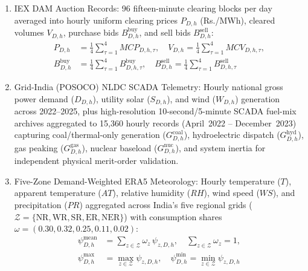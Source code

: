 \documentclass[runningheads,a4paper]{llncs}
\begin{document}
\begin{enumerate}
    \item IEX DAM Auction Records: 96 fifteen-minute clearing blocks per day averaged into hourly uniform clearing prices $P_{D,h}$ (Rs./MWh), cleared volumes $V_{D,h}$, purchase bids $B_{D,h}^{\text{buy}}$, and sell bids $B_{D,h}^{\text{sell}}$:
    \begin{equation}
    \begin{aligned}
    P_{D,h} &= \frac{1}{4}\sum_{\tau=1}^{4} MCP_{D,h,\tau}, \quad V_{D,h} = \frac{1}{4}\sum_{\tau=1}^{4} MCV_{D,h,\tau}, \\
    B_{D,h}^{\text{buy}} &= \frac{1}{4}\sum_{\tau=1}^{4} B_{D,h,\tau}^{\text{buy}}, \quad B_{D,h}^{\text{sell}} = \frac{1}{4}\sum_{\tau=1}^{4} B_{D,h,\tau}^{\text{sell}}
    \end{aligned}
    \label{eq:block_agg}
    \end{equation}
    \item Grid-India (POSOCO) NLDC SCADA Telemetry: Hourly national gross power demand ($D_{D,h}$), utility solar ($S_{D,h}$), and wind ($W_{D,h}$) generation across 2022--2025, plus high-resolution 10-second/5-minute SCADA fuel-mix archives aggregated to 15,360 hourly records (April~2022 -- December~2023) capturing coal/thermal-only generation ($G_{D,h}^{\text{coal}}$), hydroelectric dispatch ($G_{D,h}^{\text{hyd}}$), gas peaking ($G_{D,h}^{\text{gas}}$), nuclear baseload ($G_{D,h}^{\text{nuc}}$), and system inertia for independent physical merit-order validation.
    \item Five-Zone Demand-Weighted ERA5 Meteorology: Hourly temperature ($T$), apparent temperature ($AT$), relative humidity ($RH$), wind speed ($WS$), and precipitation ($PR$) aggregated across India's five regional grids ($\mathcal{Z} = \{\text{NR}, \text{WR}, \text{SR}, \text{ER}, \text{NER}\}$) with consumption shares $\omega = (0.30, 0.32, 0.25, 0.11, 0.02)$:
    \begin{equation}
    \begin{aligned}
    \psi_{D,h}^{\text{mean}} &= \sum_{z \in \mathcal{Z}} \omega_z \, \psi_{z,D,h}, \quad \sum_{z \in \mathcal{Z}} \omega_z = 1, \\
    \psi_{D,h}^{\text{max}} &= \max_{z \in \mathcal{Z}} \psi_{z,D,h}, \quad \psi_{D,h}^{\text{min}} = \min_{z \in \mathcal{Z}} \psi_{z,D,h}
    \end{aligned}
    \label{eq:spatial_weather}
    \end{equation}
\end{enumerate}
\end{document}

